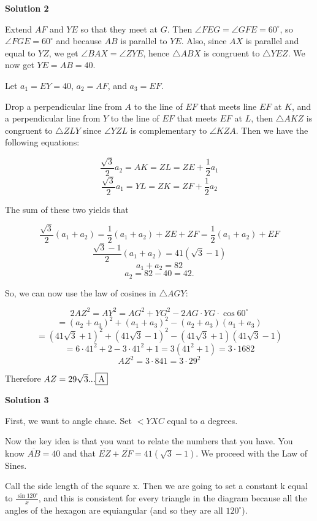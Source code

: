 \begin{enumerate}
 



\textbf{Solution 2}

Extend $AF$ and $YE$ so that they meet at $G$. Then $\angle FEG=\angle GFE=60^{\circ}$, so $\angle FGE=60^{\circ}$ and because $AB$ is parallel to $YE$. Also, since $AX$ is parallel and equal to $YZ$, we get $\angle BAX = \angle ZYE$, hence $\triangle ABX$ is congruent to $\triangle YEZ$. We now get $YE=AB=40$.

 Let $a_1=EY=40$, $a_2=AF$, and $a_3=EF$.

 Drop a perpendicular line from $A$ to the line of $EF$ that meets line $EF$ at $K$, and a perpendicular line from $Y$ to the line of $EF$ that meets $EF$ at $L$, then $\triangle AKZ$ is congruent to $\triangle ZLY$ since $\angle YZL$ is complementary to $\angle KZA$. Then we have the following equations:

 
 \[\frac{\sqrt{3}}{2}a_2 = AK=ZL = ZE+\frac{1}{2} a_1\]
 \[\frac{\sqrt{3}}{2}a_1 = YL =ZK = ZF+\frac{1}{2} a_2\]

 The sum of these two yields that 

 
 \[\frac{\sqrt{3}}{2}(a_1+a_2) = \frac{1}{2} (a_1+a_2) + ZE+ZF =  \frac{1}{2} (a_1+a_2) + EF\]
 \[\frac{\sqrt{3}-1}{2}(a_1+a_2) = 41(\sqrt{3}-1)\]
 \[a_1+a_2=82\]
 \[a_2=82-40=42.\]

 So, we can now use the law of cosines in $\triangle AGY$:

 
 \[2AZ^2 = AY^2 = AG^2 + YG^2 - 2AG\cdot YG \cdot \cos 60^{\circ}\]
 \[= (a_2+a_3)^2 + (a_1+a_3)^2 - (a_2+a_3)(a_1+a_3)\]
 \[= (41\sqrt{3}+1)^2 + (41\sqrt{3}-1)^2 - (41\sqrt{3}+1)(41\sqrt{3}-1)\]
 \[= 6 \cdot 41^2 + 2 - 3 \cdot 41^2 + 1 = 3 (41^2 + 1) = 3\cdot 1682\]
 \[AZ^2 = 3 \cdot 841 = 3 \cdot 29^2\]

 Therefore $AZ = 29\sqrt{3} ... \framebox{A}$




\textbf{Solution 3}

First, we want to angle chase. Set $<YXC$ equal to $a$ degrees. 

 Now the key idea is that you want to relate the numbers that you have. You know $\overline{AB} = 40$ and that $\overline{EZ} + \overline{ZF} = 41(\sqrt{3}-1)$. We proceed with the Law of Sines.

 Call the side length of the square x. Then we are going to set a constant k equal to $\frac{\sin 120^{\circ}}{x}$, and this is consistent for every triangle in the diagram because all the angles of the hexagon are equiangular (and so they are all $120^{\circ}$). 


\end{enumerate}
